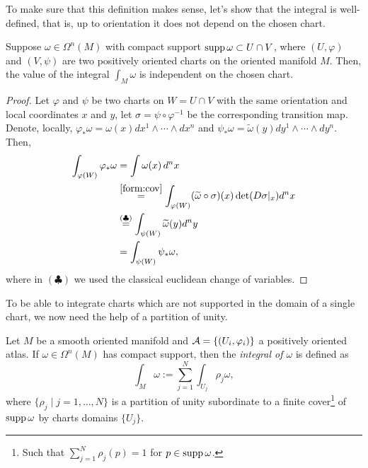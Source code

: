To make sure that this definition makes sense, let's show that the integral is well-defined, that is, up to orientation it does not depend on the chosen chart.

\begin{lemma}\label{lemma:intindep:chart}
  Suppose $\omega\in\Omega^n(M)$ with compact support $\operatorname{supp} \omega \subset U\cap V$, where $(U, \varphi)$ and $(V, \psi)$ are two positively oriented charts on the oriented manifold $M$.
  Then, the value of the integral $\int_M\omega$ is independent on the chosen chart.
\end{lemma}
\begin{proof}
  Let $\varphi$ and $\psi$ be two charts on $W = U\cap V$ with the same orientation and local coordinates $x$ and $y$, let $\sigma = \psi\circ\varphi^{-1}$ be the corresponding transition map.
  Denote, locally, $\varphi_*\omega = \omega(x) dx^1\wedge\cdots\wedge dx^n$ and $\psi_*\omega = \widetilde\omega(y) dy^1\wedge\cdots\wedge dy^n$.
  Then,
  \begin{align}
    \int_{\varphi(W)} \varphi_*\omega &= \int \omega(x)\, d^n x \\
    &\overset{\eqref{form:cov}}{=} \int_{\varphi(W)} (\widetilde\omega \circ \sigma)(x) \det(D\sigma|_x) d^n x \\
    &\overset{(\clubsuit)}{=} \int_{\psi(W)} \widetilde\omega(y) d^n y\\
    &= \int_{\psi(W)} \psi_*\omega,
  \end{align}
  where in $(\clubsuit)$ we used the classical euclidean change of variables.
\end{proof}

To be able to integrate charts which are not supported in the domain of a single chart, we now need the help of a partition of unity.

\begin{definition}
  Let $M$ be a smooth oriented manifold and $\mathcal{A} = \{(U_i,\varphi_i)\}$ a positively oriented atlas.
  If $\omega \in \Omega^n(M)$ has compact support, then the \emph{integral of $\omega$} is defined as
  \begin{equation}\label{eq:intnform}
    \int_M \omega := \sum_{j=1}^N \int_{U_j}\rho_j\omega,
  \end{equation}
  where $\{\rho_j\mid j=1,\ldots, N\}$ is a partition of unity subordinate to a finite cover\footnote{Such that $\sum_{j=1}^N \rho_j(p) = 1$ for $p\in\operatorname{supp}\omega$.} of $\operatorname{supp} \omega$ by charts domains $\{U_j\}$.
\end{definition}

